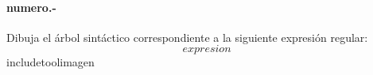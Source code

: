 

\paragraph{{numero}.-}\label{p{numero}}
Dibuja el árbol sintáctico correspondiente a la siguiente expresión regular:
\[
    {expresion}
\]
{includetool}{{imagen}}

